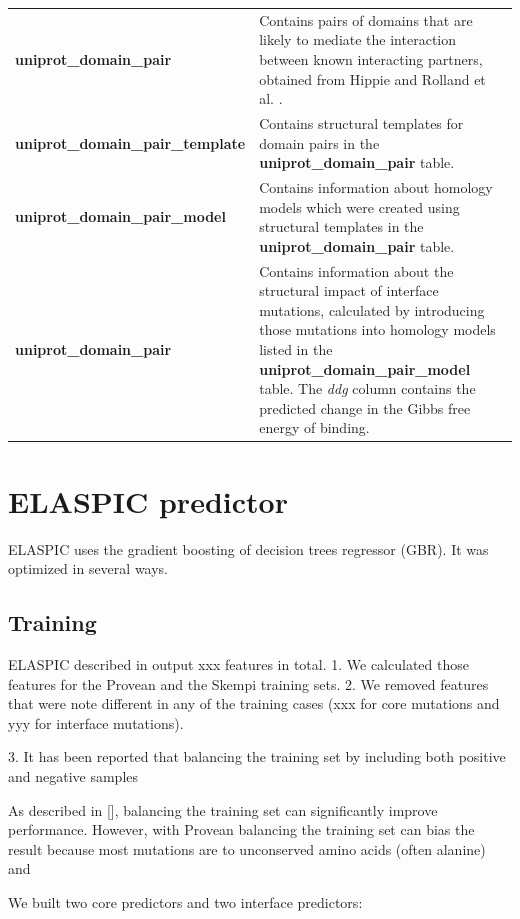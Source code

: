 \begin{table}[ht]
\begin{tabular}{l | p{10cm}}
	\textbf{uniprot\_domain\_pair} & Contains pairs of domains that are likely to mediate the interaction between known interacting partners, obtained from Hippie \cite{schaefer_hippie:_2012} and Rolland et al. \cite{rolland_proteome-scale_2014}. \\
	\textbf{uniprot\_domain\_pair\_template} & Contains structural templates for domain pairs in the \textbf{uniprot\_domain\_pair} table. \\
	\textbf{uniprot\_domain\_pair\_model} & Contains information about homology models which were created using structural templates in the \textbf{uniprot\_domain\_pair} table. \\
	\textbf{uniprot\_domain\_pair} & Contains information about the structural impact of interface mutations, calculated by introducing those mutations into homology models listed in the \textbf{uniprot\_domain\_pair\_model} table. The \textit{ddg} column contains the predicted change in the Gibbs free energy of binding. \\
	\bottomrule
\end{tabular}
\end{table}




\section{ELASPIC predictor}

ELASPIC uses the gradient boosting of decision trees regressor (GBR). It was optimized in several ways.
\subsection{Training}

ELASPIC described in  output xxx features in total.
1. We calculated those features for the Provean and the Skempi training sets.
2. We removed features that were note different in any of the training cases (xxx for core mutations and yyy for interface mutations).

3. It has been reported that balancing the training set by including both positive and negative samples


As described in [], balancing the training set can significantly improve performance. However, with Provean balancing the training set can bias the result because most mutations are to unconserved amino acids (often alanine) and



We built two core predictors and two interface predictors:

